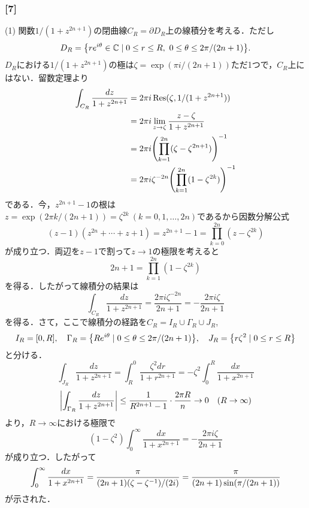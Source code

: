 \documentclass[a4j]{ltjsarticle}
\newcommand{\Cset}{\mathbb{C}}
\newcommand{\1}{\mathbbm{1}}
\numberwithin{equation}{section}
\theoremstyle{definition}
\begin{document}
\subsubsection*{[7]}
(1) 関数$1/(1+z^{2n+1})$の閉曲線$C_R=\partial D_R$上の線積分を考える．ただし
\begin{equation}
    D_R=\qty{re^{i\theta}\in \Cset\mid 0\leq r\leq R,\ 0\leq\theta\leq 2\pi/(2n+1)}.
\end{equation}
$D_R$における$1/(1+z^{2n+1})$の極は$\zeta=\exp(\pi i/(2n+1))$ただ1つで，$C_R$上にはない．留数定理より
\begin{align}
    \int_{C_R}\frac{dz}{1+z^{2n+1}}&=2\pi i\Residue(\zeta,1/(1+z^{2n+1}))\\
    &=2\pi i\lim_{z\to\zeta}\frac{z-\zeta}{1+z^{2n+1}}\\
    &=2\pi i\qty(\prod_{k=1}^{2n}(\zeta-\zeta^{2n+1}))^{-1}\\
    &=2\pi i\zeta^{-2n}\qty(\prod_{k=1}^{2n}(1-\zeta^{2k}))^{-1}
\end{align}
である．今，$z^{2n+1}-1$の根は$z=\exp(2\pi k/(2n+1))=\zeta^{2k}\ (k=0,1,\ldots,2n)$であるから因数分解公式
\begin{equation}
    (z-1)(z^{2n}+\cdots+z+1)=z^{2n+1}-1=\prod_{k=0}^{2n}(z-\zeta^{2k})
\end{equation}
が成り立つ．両辺を$z-1$で割って$z\to1$の極限を考えると
\begin{equation}
    2n+1=\prod_{k=1}^{2n}(1-\zeta^{2k})
\end{equation}
を得る．したがって線積分の結果は
\begin{equation}
    \int_{C_R}\frac{dz}{1+z^{2n+1}}=\frac{2\pi i\zeta^{-2n}}{2n+1}=-\frac{2\pi i\zeta}{2n+1}
\end{equation}
を得る．さて，ここで線積分の経路を$C_R=I_R\cup \Gamma_R\cup J_{R}$,
\begin{equation}
    I_{R}=[0,R],\quad \Gamma_R=\qty{Re^{i\theta}\mid 0\leq \theta\leq 2\pi/(2n+1)},\quad J_R=\qty{r\zeta^2\mid 0\leq r\leq R}
\end{equation}
と分ける．
\begin{equation}
    \int_{J_R}\frac{dz}{1+z^{2n+1}}=\int_{R}^{0}\frac{\zeta^2dr}{1+r^{2n+1}}=-\zeta^2\int_{0}^{R}\frac{dx}{1+x^{2n+1}}
\end{equation}
\begin{equation}
    \abs{\int_{\Gamma_R}\frac{dz}{1+z^{2n+1}}}\leq \frac{1}{R^{2n+1}-1}\cdot\frac{2\pi R}{n}\to 0\quad (R\to\infty)
\end{equation}
より，$R\to\infty$における極限で
\begin{equation}
    (1-\zeta^2)\int_{0}^{\infty}\frac{dx}{1+x^{2n+1}}=-\frac{2\pi i \zeta}{2n+1}
\end{equation}
が成り立つ．したがって
\begin{equation}
    \int_{0}^{\infty}\frac{dx}{1+x^{2n+1}}=\frac{\pi}{(2n+1)\qty(\zeta-\zeta^{-1})/(2i)}=\frac{\pi}{(2n+1)\sin(\pi/(2n+1))}
\end{equation}
が示された．
\end{document}
